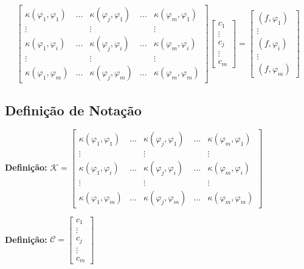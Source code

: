   \[\begin{bmatrix}
    \kappa(\varphi_1, \varphi_1) & \dots & \kappa(\varphi_j, \varphi_1) & \dots & \kappa(\varphi_m, \varphi_1)\\
    \vdots & & \vdots & & \vdots \\
    \kappa(\varphi_1, \varphi_i) & \dots & \kappa(\varphi_j, \varphi_i) & \dots & \kappa(\varphi_m, \varphi_i)\\
    \vdots & & \vdots & & \vdots \\
    \kappa(\varphi_1, \varphi_m) & \dots & \kappa(\varphi_j, \varphi_m) & \dots & \kappa(\varphi_m, \varphi_m)
  \end{bmatrix}
  \begin{bmatrix}
    c_1 \\ \vdots \\ c_j \\ \vdots \\ c_m
  \end{bmatrix} =
  \begin{bmatrix}
    (f, \varphi_1) \\ \vdots \\ (f, \varphi_i) \\ \vdots \\ (f, \varphi_m)
  \end{bmatrix}\]


\subsection*{Definição de Notação}

  \textbf{Definição:} $\displaystyle \mathcal{K} = \begin{bmatrix}
    \kappa(\varphi_1, \varphi_1) & \dots & \kappa(\varphi_j, \varphi_1) & \dots & \kappa(\varphi_m, \varphi_1)\\
    \vdots & & \vdots & & \vdots \\
    \kappa(\varphi_1, \varphi_i) & \dots & \kappa(\varphi_j, \varphi_i) & \dots & \kappa(\varphi_m, \varphi_i)\\
    \vdots & & \vdots & & \vdots \\
    \kappa(\varphi_1, \varphi_m) & \dots & \kappa(\varphi_j, \varphi_m) & \dots & \kappa(\varphi_m, \varphi_m)
  \end{bmatrix}$

  \textbf{Definição:} $\displaystyle \mathcal{C} = \begin{bmatrix}
    c_1 \\ \vdots \\ c_j \\ \vdots \\ c_m
  \end{bmatrix}$

